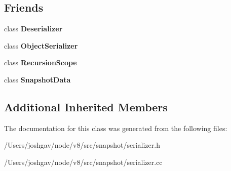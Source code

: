 \subsection*{Friends}
\begin{DoxyCompactItemize}
\item 
class {\bfseries Deserializer}\hypertarget{classv8_1_1internal_1_1_serializer_a0c541e43f0cc8d5a52e519ebcf1709f5}{}\label{classv8_1_1internal_1_1_serializer_a0c541e43f0cc8d5a52e519ebcf1709f5}

\item 
class {\bfseries Object\+Serializer}\hypertarget{classv8_1_1internal_1_1_serializer_a075eec39eaa96c886c847f9364a847c4}{}\label{classv8_1_1internal_1_1_serializer_a075eec39eaa96c886c847f9364a847c4}

\item 
class {\bfseries Recursion\+Scope}\hypertarget{classv8_1_1internal_1_1_serializer_a55104e5c91ee0965928e74136814504c}{}\label{classv8_1_1internal_1_1_serializer_a55104e5c91ee0965928e74136814504c}

\item 
class {\bfseries Snapshot\+Data}\hypertarget{classv8_1_1internal_1_1_serializer_aa8477a89e7de3c34fb2b443ff877f9da}{}\label{classv8_1_1internal_1_1_serializer_aa8477a89e7de3c34fb2b443ff877f9da}

\end{DoxyCompactItemize}
\subsection*{Additional Inherited Members}


The documentation for this class was generated from the following files\+:\begin{DoxyCompactItemize}
\item 
/\+Users/joshgav/node/v8/src/snapshot/serializer.\+h\item 
/\+Users/joshgav/node/v8/src/snapshot/serializer.\+cc\end{DoxyCompactItemize}
